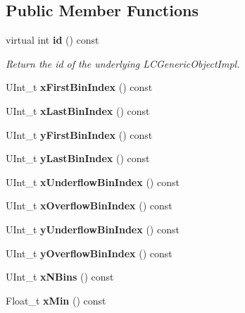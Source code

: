 \subsection*{Public Member Functions}
\begin{DoxyCompactItemize}
\item 
virtual int {\bf id} () const \label{classhistmgr_1_1Histogram2D_a76da2e4085a49feffbcf45457b55634d}

\begin{DoxyCompactList}\small\item\em Return the id of the underlying LCGenericObjectImpl. \item\end{DoxyCompactList}\item 
UInt\_\-t {\bfseries xFirstBinIndex} () const \label{classhistmgr_1_1Histogram2D_abf70969b4294719fb4c480d2485b6f02}

\item 
UInt\_\-t {\bfseries xLastBinIndex} () const \label{classhistmgr_1_1Histogram2D_aa816778d15e7eb3b9ab2affa02ceae0c}

\item 
UInt\_\-t {\bfseries yFirstBinIndex} () const \label{classhistmgr_1_1Histogram2D_a3e3a5b7d3d907c8be90ca562a2ea832c}

\item 
UInt\_\-t {\bfseries yLastBinIndex} () const \label{classhistmgr_1_1Histogram2D_af850544bb3c6d6a278e518a4ba7c5146}

\item 
UInt\_\-t {\bfseries xUnderflowBinIndex} () const \label{classhistmgr_1_1Histogram2D_ac6e27ddf89725fe49eeaf1568c8024c2}

\item 
UInt\_\-t {\bfseries xOverflowBinIndex} () const \label{classhistmgr_1_1Histogram2D_a6eb4490be5315d81c344a6e17d6cd1f6}

\item 
UInt\_\-t {\bfseries yUnderflowBinIndex} () const \label{classhistmgr_1_1Histogram2D_a09627b05e21e4544e621efc423936c81}

\item 
UInt\_\-t {\bfseries yOverflowBinIndex} () const \label{classhistmgr_1_1Histogram2D_a994f0c6eaf2179019ad0202282b73c80}

\item 
UInt\_\-t {\bfseries xNBins} () const \label{classhistmgr_1_1Histogram2D_a955bc09c119a9ccf995c40d055556250}

\item 
Float\_\-t {\bfseries xMin} () const \label{classhistmgr_1_1Histogram2D_a9c5990884d2b038d94e56640e8f70a12}


\end{DoxyCompactItemize}
